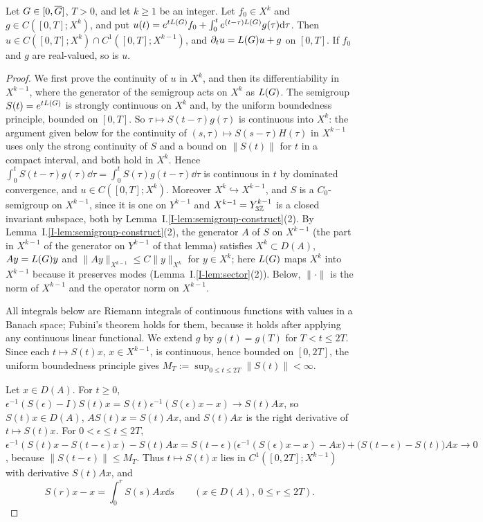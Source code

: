 \begin{lemma}
\label{lem:duhamel}
Let $G\in[0,\overline{G}]$, $T>0$, and let $k\ge1$ be an integer. Let $f_0\in X^k$ and
$g\in C([0,T];X^k)$, and put
$u(t)=e^{tL(G)}f_0+\int_0^te^{(t-\tau)L(G)}g(\tau)\dd\tau$. Then
$u\in C([0,T];X^k)\cap C^1([0,T];X^{k-1})$, and $\partial_tu=L(G)u+g$ on
$[0,T]$. If $f_0$ and $g$ are real-valued, so is $u$.
\end{lemma}
\begin{proof}
We first prove the continuity of $u$ in $X^k$, and then its differentiability in
$X^{k-1}$, where the generator of the semigroup acts on $X^k$ as $L(G)$.
The semigroup $S(t)=e^{tL(G)}$ is strongly continuous on $X^k$ and, by the
uniform boundedness principle, bounded on $[0,T]$. So $\tau\mapsto S(t-\tau)g(\tau)$
is continuous into $X^k$: the argument given below for the continuity of
$(s,\tau)\mapsto S(s-\tau)H(\tau)$ in $X^{k-1}$ uses only the strong continuity of
$S$ and a bound on $\|S(t)\|$ for $t$ in a compact interval, and both hold in
$X^k$. Hence
$\int_0^tS(t-\tau)g(\tau)\dd\tau=\int_0^tS(\tau)g(t-\tau)\dd\tau$
is continuous in $t$ by dominated convergence, and $u\in C([0,T];X^k)$. Moreover
$X^k\hookrightarrow X^{k-1}$, and $S$ is a $C_0$-semigroup on $X^{k-1}$, since it
is one on $Y^{k-1}$ and $X^{k-1}=Y^{k-1}_{3\mathbb{Z}}$ is a closed invariant subspace,
both by Lemma~I.\ref{I-lem:semigroup-construct}\textup{(2)}. By
Lemma~I.\ref{I-lem:semigroup-construct}\textup{(2)}, the generator $A$ of $S$ on
$X^{k-1}$ (the part in $X^{k-1}$ of the generator on $Y^{k-1}$ of that lemma)
satisfies $X^k\subset D(A)$, $Ay=L(G)y$ and $\|Ay\|_{X^{k-1}}\le C\|y\|_{X^k}$ for
$y\in X^k$; here $L(G)$ maps $X^k$ into $X^{k-1}$ because it preserves modes
(Lemma~I.\ref{I-lem:sector}\textup{(2)}). Below, $\|\cdot\|$ is the norm of $X^{k-1}$ and
the operator norm on $X^{k-1}$.

All integrals below are Riemann integrals of continuous functions with values
in a Banach space; Fubini's theorem holds for them, because it holds after
applying any continuous linear functional. We extend $g$ by $g(t)=g(T)$ for
$T<t\le2T$. Since each $t\mapsto S(t)x$, $x\in X^{k-1}$, is continuous, hence bounded on $[0,2T]$, the
uniform boundedness principle gives $M_T:=\sup_{0\le t\le2T}\|S(t)\|<\infty$.

Let $x\in D(A)$. For $t\ge0$,
$\epsilon^{-1}(S(\epsilon)-I)S(t)x=S(t)\epsilon^{-1}(S(\epsilon)x-x)\to S(t)Ax$, so $S(t)x\in D(A)$,
$AS(t)x=S(t)Ax$, and $S(t)Ax$ is the right derivative of $t\mapsto S(t)x$. For
$0<\epsilon\le t\le2T$,
$\epsilon^{-1}(S(t)x-S(t-\epsilon)x)-S(t)Ax=S(t-\epsilon)\big(\epsilon^{-1}(S(\epsilon)x-x)-Ax\big)+\big(S(t-\epsilon)-S(t)\big)Ax\to0$,
because $\|S(t-\epsilon)\|\le M_T$. Thus $t\mapsto S(t)x$ lies in $C^1([0,2T];X^{k-1})$ with
derivative $S(t)Ax$, and
\begin{equation}
\label{eq:semigroup-FTC}
S(r)x-x=\int_0^rS(s)Ax\dd s\qquad(x\in D(A),\ 0\le r\le2T).
\end{equation}


\end{proof}
